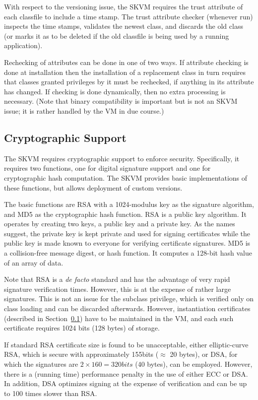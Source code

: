 \documentclass{llncs}
\begin{document}
With respect to the versioning issue, the SKVM requires the trust
attribute of each classfile to include a time stamp. The trust attribute
checker (whenever run) inspects the time stamps, validates the newest
class, and discards the old class (or marks it as to be deleted if the
old classfile is being used by a running application).

Rechecking of attributes can be done in one of two ways. If attribute
checking is done at installation then the installation of a replacement
class in turn requires that classes granted privileges by it must be
rechecked, if anything in its attribute has changed. If checking is
done dynamically, then no extra processing is necessary. (Note that
binary compatibility is important but is not an SKVM issue; it is rather
handled by the VM in due course.)


\subsection{Cryptographic Support}
\label{crypto-support}

The SKVM requires cryptographic support to enforce security.
Specifically, it requires two functions, one for digital signature
support and one for cryptographic hash computation. The SKVM provides
basic implementations of these functions, but allows deployment of
custom versions.

The basic functions are RSA with a 1024-modulus key as the signature
algorithm, and MD5 as the cryptographic hash function. RSA is a public
key algorithm. It operates by creating two keys, a public key and a
private key. As the names suggest, the private key is kept private and
used for signing certificates while the public key is made known to
everyone for verifying certificate signatures. MD5 is a collision-free
message digest, or hash function. It computes a 128-bit hash value of an
array of data.

Note that RSA is a \emph{de facto} standard and has the advantage of very rapid
signature verification times. However, this is at the expense of rather
large signatures. This is not an issue for the subclass privilege, which
is verified only on class loading and can be discarded afterwards.
However, instantiation certificates (described in Section~\ref{crypto-support})
have to be maintained in the VM, and each such certificate requires 1024 bits
(128 bytes) of storage.

If standard RSA certificate size is found to be unacceptable, either
elliptic-curve RSA, which is secure with approximately 155bits ($\approx$ 20
bytes), or DSA, for which the signatures are $2 \times 160 = 320 bits$ (40 bytes),
can be employed. However, there is a (running time) performance penalty
in the use of either ECC or DSA. In addition, DSA optimizes signing at
the expense of verification and can be up to 100 times slower than RSA.
\end{document}
